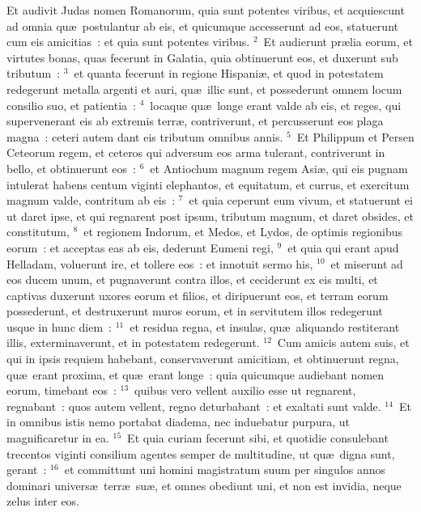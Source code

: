 \lettrine[lines=3,image=true,loversize=0.05,lraise=-0.03]{E}{}t audivit Judas nomen Romanorum, quia sunt potentes viribus, et acquiescunt ad omnia qu\ae\ postulantur ab eis, et quicumque accesserunt ad eos, statuerunt cum eis amicitias~: et quia sunt potentes viribus.
${}^{2}$~Et audierunt pr\ae lia eorum, et virtutes bonas, quas fecerunt in Galatia, quia obtinuerunt eos, et duxerunt sub tributum~:
${}^{3}$~et quanta fecerunt in regione Hispani\ae , et quod in potestatem redegerunt metalla argenti et auri, qu\ae\ illic sunt, et possederunt omnem locum consilio suo, et patientia~:
${}^{4}$~locaque qu\ae\ longe erant valde ab eis, et reges, qui supervenerant eis ab extremis terr\ae , contriverunt, et percusserunt eos plaga magna~: ceteri autem dant eis tributum omnibus annis.
${}^{5}$~Et Philippum et Persen Ceteorum regem, et ceteros qui adversum eos arma tulerant, contriverunt in bello, et obtinuerunt eos~:
${}^{6}$~et Antiochum magnum regem Asi\ae , qui eis pugnam intulerat habens centum viginti elephantos, et equitatum, et currus, et exercitum magnum valde, contritum ab eis~:
${}^{7}$~et quia ceperunt eum vivum, et statuerunt ei ut daret ipse, et qui regnarent post ipsum, tributum magnum, et daret obsides, et constitutum,
${}^{8}$~et regionem Indorum, et Medos, et Lydos, de optimis regionibus eorum~: et acceptas eas ab eis, dederunt Eumeni regi,
${}^{9}$~et quia qui erant apud Helladam, voluerunt ire, et tollere eos~: et innotuit sermo his,
${}^{10}$~et miserunt ad eos ducem unum, et pugnaverunt contra illos, et ceciderunt ex eis multi, et captivas duxerunt uxores eorum et filios, et diripuerunt eos, et terram eorum possederunt, et destruxerunt muros eorum, et in servitutem illos redegerunt usque in hunc diem~:
${}^{11}$~et residua regna, et insulas, qu\ae\ aliquando restiterant illis, exterminaverunt, et in potestatem redegerunt.
${}^{12}$~Cum amicis autem suis, et qui in ipsis requiem habebant, conservaverunt amicitiam, et obtinuerunt regna, qu\ae\ erant proxima, et qu\ae\ erant longe~: quia quicumque audiebant nomen eorum, timebant eos~:
${}^{13}$~quibus vero vellent auxilio esse ut regnarent, regnabant~: quos autem vellent, regno deturbabant~: et exaltati sunt valde.
${}^{14}$~Et in omnibus istis nemo portabat diadema, nec induebatur purpura, ut magnificaretur in ea.
${}^{15}$~Et quia curiam fecerunt sibi, et quotidie consulebant trecentos viginti consilium agentes semper de multitudine, ut qu\ae\ digna sunt, gerant~:
${}^{16}$~et committunt uni homini magistratum suum per singulos annos dominari univers\ae\ terr\ae\ su\ae , et omnes obediunt uni, et non est invidia, neque zelus inter eos.


